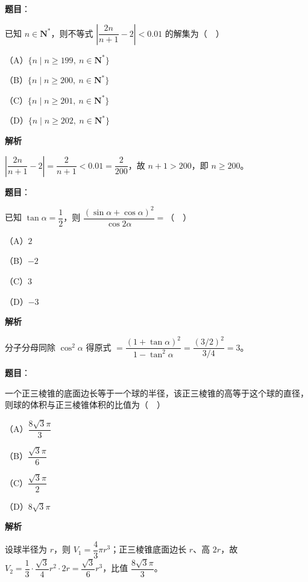 \begin{answer}

\textbf{题目}：

已知 $n\in\mathbf N^*$，则不等式 $\left|\dfrac{2n}{n+1}-2\right|<0.01$ 的解集为（　）

（A）$\{n\mid n\geqslant199,\ n\in\mathbf N^*\}$

（B）$\{n\mid n\geqslant200,\ n\in\mathbf N^*\}$

（C）$\{n\mid n\geqslant201,\ n\in\mathbf N^*\}$

（D）$\{n\mid n\geqslant202,\ n\in\mathbf N^*\}$

\textbf{解析}

$\left|\dfrac{2n}{n+1}-2\right|=\dfrac2{n+1}<0.01=\dfrac2{200}$，故 $n+1>200$，即 $n\geqslant200$。


\end{answer}
\begin{answer}

\textbf{题目}：

已知 $\tan\alpha=\dfrac12$，则 $\dfrac{(\sin\alpha+\cos\alpha)^2}{\cos2\alpha}=$（　）

（A）$2$

（B）$-2$

（C）$3$

（D）$-3$

\textbf{解析}

分子分母同除 $\cos^2\alpha$ 得原式 $=\dfrac{(1+\tan\alpha)^2}{1-\tan^2\alpha}=\dfrac{(3/2)^2}{3/4}=3$。


\end{answer}
\begin{answer}

\textbf{题目}：

一个正三棱锥的底面边长等于一个球的半径，该正三棱锥的高等于这个球的直径，则球的体积与正三棱锥体积的比值为（　）

（A）$\dfrac{8\sqrt3\pi}3$

（B）$\dfrac{\sqrt3\pi}6$

（C）$\dfrac{\sqrt3\pi}2$

（D）$8\sqrt3\pi$

\textbf{解析}

设球半径为 $r$，则 $V_1=\dfrac43\pi r^3$；正三棱锥底面边长 $r$、高 $2r$，故 $V_2=\dfrac13\cdot\dfrac{\sqrt3}4r^2\cdot2r=\dfrac{\sqrt3}6r^3$，比值 $\dfrac{8\sqrt3\pi}3$。


\end{answer}
